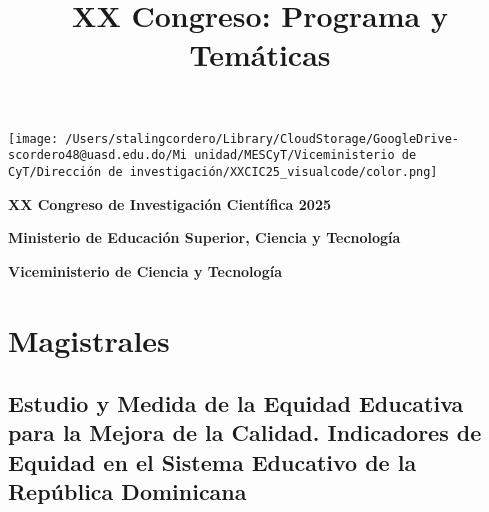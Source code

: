 \documentclass[11pt,a4paper]{article}
\title{XX Congreso: Programa y Temáticas}
\author{}
\date{}
\begin{document}
\begin{titlepage}
    \centering
    
    \texttt{[image: /Users/stalingcordero/Library/CloudStorage/GoogleDrive-scordero48@uasd.edu.do/Mi unidad/MESCyT/Viceministerio de CyT/Dirección de investigación/XXCIC25\_visualcode/color.png]} \\
    \vspace{2cm} %
    
    {\Huge \textbf{XX Congreso de Investigación Científica 2025} \par}
    \vspace{1cm}
    {\LARGE \textbf{Ministerio de Educación Superior, Ciencia y Tecnología} \par}
    \vspace{0.5cm}
    {\Large \textbf{Viceministerio de Ciencia y Tecnología} \par}
    
    \vfill  %
\end{titlepage}


\maketitle
\tableofcontents
\newpage

\section{Magistrales}

\subsection{Estudio y Medida de la Equidad Educativa para la Mejora de la Calidad. Indicadores de Equidad en el Sistema Educativo de la República Dominicana}


\end{document}
